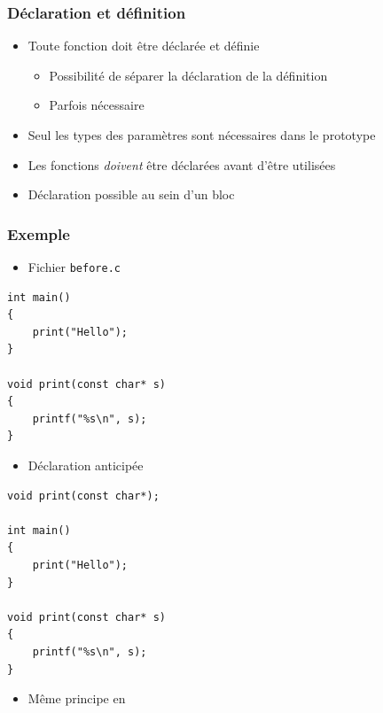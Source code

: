 \begin{frame}
\frametitle{Déclaration et définition}
\begin{itemize}
 \item Toute fonction doit être déclarée et définie
	\begin{itemize}
	\item Possibilité de séparer la déclaration de la définition
	\onslide<3->\item Parfois nécessaire
	\end{itemize}
\end{itemize}
\begin{center}
\end{center}
\begin{itemize}
 \item Seul les types des paramètres sont nécessaires dans le prototype
 \item Les fonctions \emph{doivent} être déclarées avant d'être utilisées
 \item Déclaration possible au sein d'un bloc
\end{itemize}
\end{frame}

\begin{frame}[containsverbatim]
\frametitle{Exemple}
\begin{itemize}
\item Fichier \texttt{before.c}
\end{itemize}
\begin{lstlisting}
int main()
{
	print("Hello");
}

void print(const char* s)
{
	printf("%s\n", s);
}
\end{lstlisting}
\begin{itemize}
\item Déclaration anticipée
\end{itemize}
\begin{lstlisting}
void print(const char*);

int main()
{
	print("Hello");
}

void print(const char* s)
{
	printf("%s\n", s);
}
\end{lstlisting}
\begin{itemize}
\item Même principe en \cpp
\end{itemize}
\end{frame}

